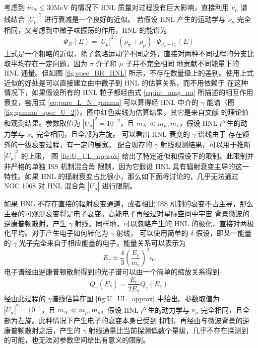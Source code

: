 \documentclass[UTF8]{ctexart}
\begin{document}
考虑到 $m_N \leq 30 \text{MeV}$ 的情况下 HNL 质量对过程没有巨大影响，直接利用 $\nu_\mu$ 谱线结合 $|U_\mu|^2$
进行衰减是一个良好的近似。 
若假设 HNL 产生的运动学与 $\nu_\mu$ 完全相同，又考虑到中微子味振荡的作用，HNL 的能谱为
\begin{equation}
  \Phi_N (E) = |U_\mu|^2 \cdot (\rho_\pi + \rho_\mu) \cdot \Phi_{\nu_\mu + \bar{\nu}_\mu} (E) \label{eq:approx_spec}
\end{equation}
上式是一个粗略的近似，除了忽略运动学不同之外，直接对两种不同过程的分支比取平均存在一定问题，因为 $\pi$ 介子和 $\mu$ 子并不完全相同
地贡献不同能量下的 HNL 通量。但如图 \ref{fig:spec_BR_HNL} 所示，不存在数量级上的差别。使用上式近似的好处是可以直接建立由中微子到
HNL 的估算关系，而不用依赖于
在这种情况下，如果假设所有的 HNL 粒子都经由式 \ref{eq:int_mag_nu} 所描述的相互作用衰变，套用式 \ref{eq:pure_L_N_gamma} 可以算得经
HNL 中介的 $\gamma$ 能谱（图 \ref{fig:gamma_spec_U_2}）。图中红色实线为估算结果，其它是来自文献 \cite{icecube2022evidence}
的理论值和观测结果。参数取值为
$|U_\mu|^2 = 10^{-2}$，且 $m_N \ll m_\mu, m_\pi$，假设 HNL 产生的动力学与 $\nu_\mu$ 完全相同，且全部为左旋。
可以看出 HNL 衰变的 $\gamma$ 谱线由于
存在额外的一级衰变过程，有一定的展宽。
配合现存的 $\gamma$ 射线观测结果，可以用于推断 $|U_\mu|^2$ 的上限，
图 \ref{fig:U_UL_approx} 给出了特定近似和假设下的限制。此限制并非严格的单独 ISS 机制混合角
限制，因为它假设 HNL 具有辐射衰变主导的这一特性。如果 HNL 的辐射衰变占比很小，那么如下面将讨论的，几乎无法通过
NGC 1068 对 HNL 混合角 $|U_\mu|$ 进行限制。

如果 HNL 不存在直接的辐射衰变通道，或者相比 ISS 机制的衰变不占主导，那么主要的可观测衰变将是电子衰变。高能电子再经过对星际空间中宇宙
背景微波的逆康普顿散射，产生 $\gamma$ 射线。同样地，可以忽略产生的 HNL 的极化，直接对两极化平均。对于产生电子如何转化为 $\gamma$ 射线，
可以使用简单的 $\delta$ 假设，即某一能量的 $\gamma$ 光子完全来自于相应能量的电子。能量关系可以表示为 \cite{RevModPhys.42.237}
\begin{equation}
  E_\gamma \approx \frac{4}{3} \left( \frac{E_e}{m_e} \right)^2 \epsilon_0
\end{equation}
电子谱经由逆康普顿散射得到的光子谱可以由一个简单的缩放关系得到
\begin{equation}
  Q_\gamma(E_\gamma) = \frac{E_e}{2 E_\gamma} Q_e(E_e) 
\end{equation}
经由此过程的 $\gamma$谱线估算在图 \ref{fig:U_UL_approx} 中绘出。参数取值为
$|U_\mu|^2 = 10^{-1}$，且 $m_N \ll m_\mu, m_\pi$，假设 HNL 产生的动力学与 $\nu_\mu$ 完全相同，且全部为左旋。此种情况下产生电子的衰变本身已受到
抑制，再经由与微波背景的逆康普顿散射之后，产生的 $\gamma$ 射线通量比当前探测低数个量级，几乎不存在探测到的可能，也无法对参数空间给出有意义的限制。
\end{document}

